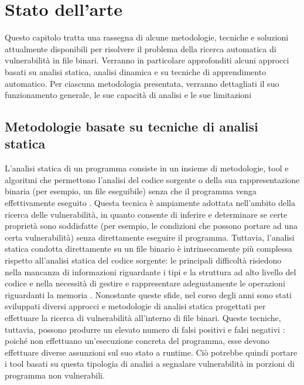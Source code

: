 \documentclass[../main.tex]{subfiles}
\begin{document}
\chapter{Stato dell'arte}
\label{chap:related}
Questo capitolo tratta una rassegna di alcune metodologie, tecniche e soluzioni attualmente disponibili per risolvere il problema della ricerca automatica di vulnerabilità in file binari.
Verranno in particolare approfonditi alcuni approcci basati su analisi statica, analisi dinamica e su tecniche di apprendimento automatico.
Per ciascuna metodologia presentata, verranno dettagliati il suo funzionamento generale, le sue capacità di analisi e le sue limitazioni

\section{Metodologie basate su tecniche di analisi statica}
L'analisi statica di un programma consiste in un insieme di metodologie, tool e algoritmi che permettono l'analisi del codice sorgente o della
sua rappresentazione binaria (per esempio, un file eseguibile) senza che il programma venga effettivamente eseguito \cite{static_analysis_introduction}.
Questa tecnica è ampiamente adottata nell'ambito della ricerca delle vulnerabilità, in quanto consente di inferire e determinare se
certe proprietà sono soddisfatte (per esempio, le condizioni che possono portare ad una certa vulnerabilità) senza direttamente eseguire il programma.
Tuttavia, l'analisi statica condotta direttamente su un file binario è intrinsecamente più complessa rispetto all'analisi statica del codice sorgente:
le principali difficoltà risiedono nella mancanza di informazioni riguardante i tipi e la struttura ad alto livello del codice \cite{Review_of_static_analysis} e nella necessità di gestire e rappresentare adeguatamente le operazioni riguardanti la memoria \cite{CodeSurfer}.
Nonostante queste sfide, nel corso degli anni sono stati sviluppati diversi approcci e metodologie di analisi statica progettati per effettuare la ricerca di vulnerabilità all'interno di file binari.
Queste tecniche, tuttavia, possono produrre un elevato numero di falsi positivi e falsi negativi : poiché non effettuano un'esecuzione concreta del programma,
esse devono effettuare diverse assunzioni sul suo stato a runtime. Ciò potrebbe quindi portare i tool basati su questa tipologia di analisi a segnalare vulnerabilità in porzioni di programma non vulnerabili.
\end{document}
